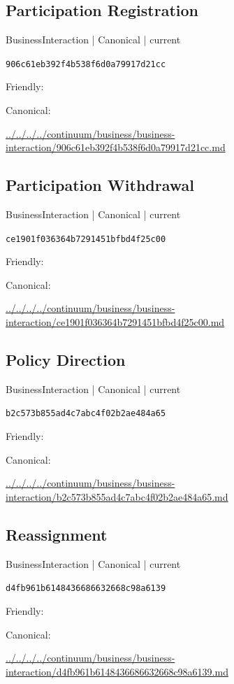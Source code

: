 \documentclass[10pt,a4paper]{article}
\begin{document}
\subsection*{Participation Registration}
{\small BusinessInteraction | Canonical | current}\par
\texttt{906c61eb392f4b538f6d0a79917d21cc}\par
Friendly: \par
Canonical: \par
{\footnotesize\url{../../../../continuum/business/business-interaction/906c61eb392f4b538f6d0a79917d21cc.md}}\par
\subsection*{Participation Withdrawal}
{\small BusinessInteraction | Canonical | current}\par
\texttt{ce1901f036364b7291451bfbd4f25c00}\par
Friendly: \par
Canonical: \par
{\footnotesize\url{../../../../continuum/business/business-interaction/ce1901f036364b7291451bfbd4f25c00.md}}\par
\subsection*{Policy Direction}
{\small BusinessInteraction | Canonical | current}\par
\texttt{b2c573b855ad4c7abc4f02b2ae484a65}\par
Friendly: \par
Canonical: \par
{\footnotesize\url{../../../../continuum/business/business-interaction/b2c573b855ad4c7abc4f02b2ae484a65.md}}\par
\subsection*{Reassignment}
{\small BusinessInteraction | Canonical | current}\par
\texttt{d4fb961b6148436686632668c98a6139}\par
Friendly: \par
Canonical: \par
{\footnotesize\url{../../../../continuum/business/business-interaction/d4fb961b6148436686632668c98a6139.md}}\par
\end{document}
